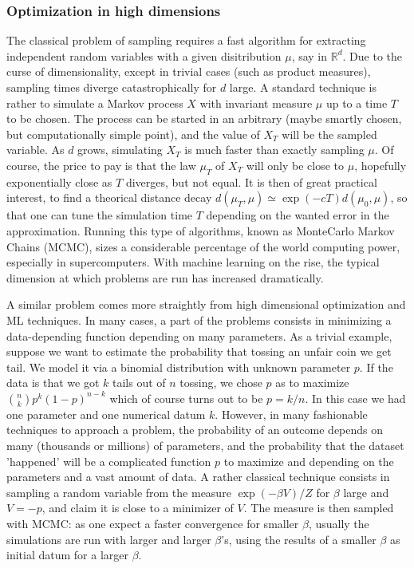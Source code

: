\documentclass[reqno]{amsart}
\newcounter{as}[section]
\newcommand{\bb}[1]{{\mathbb #1}}
\newcommand{\<}{\langle}
\renewcommand{\>}{\rangle}
\begin{document}
\subsubsection*{Optimization in high dimensions} The classical problem of sampling requires a fast algorithm for extracting independent random variables with a given disitribution $\mu$, say in $\bb R^d$. Due to the curse of dimensionality, except in trivial cases (such as product measures), sampling times diverge catastrophically for $d$ large. A standard technique is rather to simulate a Markov process $X$ with invariant measure $\mu$ up to a time $T$ to be chosen. The process can be started in an arbitrary (maybe smartly chosen, but computationally simple point), and the value of $X_T$ will be the sampled variable. As $d$ grows, simulating $X_T$ is much faster than exactly sampling $\mu$. Of course, the price to pay is that the law $\mu_T$ of $X_T$ will only be close to $\mu$, hopefully exponentially close as $T$ diverges, but not equal. It is then of great practical interest, to find a theorical distance decay $d(\mu_T,\mu)\simeq \exp(- c T) d(\mu_0,\mu)$, so that one can tune the simulation time $T$ depending on the wanted error in the approximation. Running this type of algorithms, known as MonteCarlo Markov Chains (MCMC), sizes a considerable percentage of the world computing power, especially in supercomputers. With machine learning on the rise, the typical dimension at which problems are run has increased dramatically.

A similar problem comes more straightly from high dimensional optimization and ML techniques. In many cases, a part of the problems consists in minimizing a data-depending function depending on many parameters. As a trivial example, suppose we want to estimate the probability that tossing an unfair coin we get tail. We model it via a binomial distribution with unknown parameter $p$. If the data is that we got $k$ tails out of $n$ tossing, we chose $p$ as to maximize $\binom{n}{k}p^k (1-p)^{n-k}$ which of course turns out to be $p=k/n$. In this case we had one parameter and one numerical datum $k$. However, in many fashionable techniques to approach a problem, the probability of an outcome depends on many (thousands or millions) of parameters, and the probability that the dataset 'happened' will be a complicated function $p$ to maximize and depending on the parameters and a vast amount of data. A rather classical technique consists in sampling a random variable from the measure $\exp(-\beta V)/Z$ for $\beta$ large and $V=-p$, and claim it is close to a minimizer of $V$. The measure is then sampled with MCMC: as one expect a faster convergence for smaller $\beta$, usually the simulations are run with larger and larger $\beta$'s, using the results of a smaller $\beta$ as initial datum for a larger $\beta$.
\end{document}
